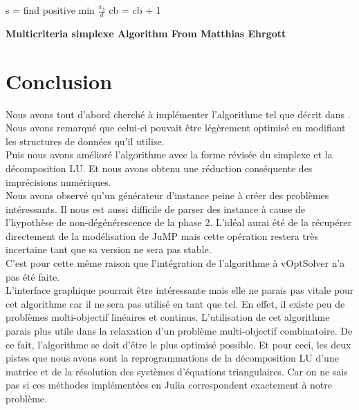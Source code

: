 \documentclass[a4paper,10pt]{article}
\theoremstyle{plain}
\begin{document}
\begin{algorithm}[!h]
\begin{small}
{{{          s = find positive min $\frac{x_b}{d}$
        }
      }
      cb = cb + 1      
    }
  \end{small}
  \caption{\textbf{Multicriteria simplexe Algorithm From Matthias Ehrgott\cite{ehrgott2005multicriteria}}}
\end{algorithm}

\break
\vfill

\break
\vfill

\break
\vfill

\break
\vfill

\section{Conclusion}
Nous avons tout d'abord cherché à implémenter l'algorithme tel que décrit dans \cite{ehrgott2005multicriteria}. Nous avons remarqué que celui-ci pouvait être légèrement optimisé en modifiant les structures de données qu'il utilise.\\
\indent Puis nous avons amélioré l'algorithme avec la forme révisée du simplexe et la décomposition LU. Et nous avons obtenu une réduction conséquente des imprécisions numériques.\\
\indent Nous avons observé qu'un générateur d'instance peine à créer des problèmes intéressants. Il nous est aussi difficile de parser des instance à cause de l'hypothèse de non-dégénérescence de la phase 2. L'idéal aurai été de la récupérer directement de la modélisation de JuMP mais cette opération restera très incertaine tant que sa version ne sera pas stable.\\
\indent C'est pour cette même raison que l'intégration de l'algorithme à vOptSolver n'a pas été faite.\\
\indent L'interface graphique pourrait être intéressante mais elle ne parais pas vitale pour cet algorithme car il ne sera pas utilisé en tant que tel. En effet, il existe peu de problèmes molti-objectif linéaires et continus. L'utilisation de cet algorithme parais plus utile dans la relaxation d'un problème multi-objectif combinatoire. De ce fait, l'algorithme se doit d'être le plus optimisé possible. Et pour ceci, les deux pistes que nous avons sont la reprogrammations de la décomposition LU d'une matrice et de la résolution des systèmes d'équations triangulaires. Car on ne sais pas si ces méthodes implémentées en Julia correspondent exactement à notre problème.




\end{document}
